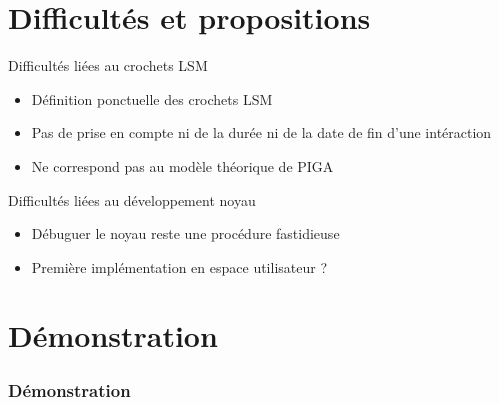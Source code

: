 \documentclass{beamer}
\begin{document}
\section{Difficultés et propositions}
\begin{frame}{Difficultés liées au crochets LSM}
	\begin{itemize}
		\item Définition ponctuelle des crochets LSM
		\item Pas de prise en compte ni de la durée ni de la date de fin d'une
intéraction
		\item Ne correspond pas au modèle théorique de PIGA
	\end{itemize}
\end{frame}

\begin{frame}{Difficultés liées au développement noyau}
	\begin{itemize}
		\item Débuguer le noyau reste une procédure fastidieuse
		\item Première implémentation en espace utilisateur ?
	\end{itemize}
\end{frame}

\section{Démonstration}
\begin{frame}
	\frametitle{Démonstration}
\end{frame}
\end{document}

